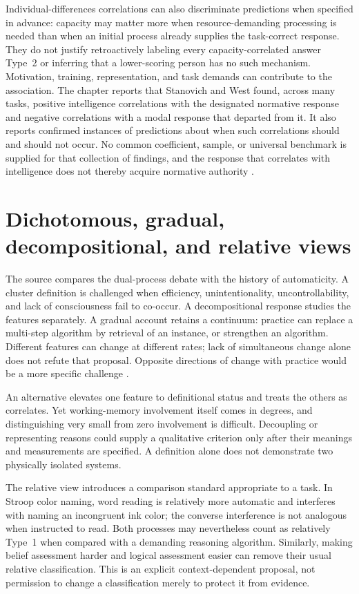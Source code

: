 Individual-differences correlations can also discriminate predictions
when specified in advance: capacity may matter more when resource-demanding
processing is needed than when an initial process already supplies the
task-correct response. They do not justify retroactively labeling every
capacity-correlated answer Type~2 or inferring that a lower-scoring
person has no such mechanism. Motivation, training, representation,
and task demands can contribute to the association.
The chapter reports that Stanovich and West found, across many tasks,
positive intelligence correlations with the designated normative response
and negative correlations with a modal response that departed from it.
It also reports confirmed instances of predictions about when such
correlations should and should not occur. No common coefficient, sample,
or universal benchmark is supplied for that collection of findings, and
the response that correlates with intelligence does not thereby acquire
normative authority \cite[p.~179]{Klauer2021DualProcess}.

\section{Dichotomous, gradual, decompositional, and relative views}

The source compares the dual-process debate with the history of
automaticity. A cluster definition is challenged when efficiency,
unintentionality, uncontrollability, and lack of consciousness fail to
co-occur. A decompositional response studies the features separately.
A gradual account retains a continuum: practice can replace a multi-step
algorithm by retrieval of an instance, or strengthen an algorithm.
Different features can change at different rates; lack of simultaneous
change alone does not refute that proposal. Opposite directions of
change with practice would be a more specific challenge
\cite[pp.~179--180]{Klauer2021DualProcess}.

An alternative elevates one feature to definitional status and treats
the others as correlates. Yet working-memory involvement itself comes
in degrees, and distinguishing very small from zero involvement is
difficult. Decoupling or representing reasons could supply a qualitative
criterion only after their meanings and measurements are specified.
A definition alone does not demonstrate two physically isolated systems.

The relative view introduces a comparison standard appropriate to a
task. In Stroop color naming, word reading is relatively more automatic
and interferes with naming an incongruent ink color; the converse
interference is not analogous when instructed to read. Both processes
may nevertheless count as relatively Type~1 when compared with a
demanding reasoning algorithm. Similarly, making belief assessment
harder and logical assessment easier can remove their usual relative
classification. This is an explicit context-dependent proposal, not
permission to change a classification merely to protect it from evidence.

